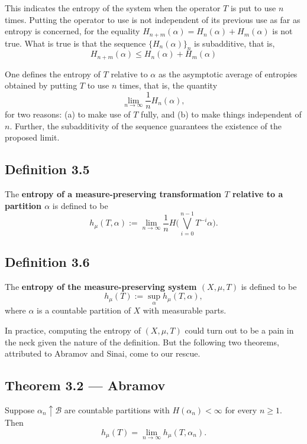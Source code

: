 \documentclass[11pt,a4paper]{article}
\begin{document}
This indicates the entropy of the system when the operator $T$ is put to use
$n$ times. Putting the operator to use is not independent of its previous use
as far as entropy is concerned, for the equality
$H_{n+m}(\alpha)=H_n(\alpha)+H_m(\alpha)$ is not true. What is true is that
the sequence $\{H_n(\alpha)\}_n$ is subadditive, that is,
\[
H_{n+m}(\alpha)\leq H_{n}(\alpha) + H_{m}(\alpha)
\]

One defines the entropy of $T$ relative to $\alpha$ as the asymptotic average
of entropies obtained by putting $T$ to use $n$ times, that is, the quantity
\[
\lim_{n\rightarrow\infty}\frac1n H_n(\alpha),
\]
for two reasons: (a) to make use of $T$ fully, and (b) to make things
independent of $n$. Further, the subadditivity of the sequence guarantees the
existence of the proposed limit.

\subsection*{Definition 3.5}
The \textbf{entropy of a measure-preserving transformation $T$ relative to a partition $\alpha$} is defined to be
\[
h_{\mu}(T, \alpha):= \lim_{n\rightarrow\infty}\frac{1}{n}H\Bigg(\bigvee_{i=0}^{n-1}T^{-i}\alpha\Bigg).
\]

\subsection*{Definition 3.6}
The \textbf{entropy of the measure-preserving system $(X, \mu, T)$} is defined to be
\[
h_{\mu}(T) := \sup_{\alpha}h_{\mu}(T, \alpha),
\]
where $\alpha$ is a countable partition of $X$ with measurable parts.

In practice, computing the entropy of $(X,\mu,T)$ could turn out to be a pain
in the neck given the nature of the definition. But the following two
theorems, attributed to Abramov and Sinai, come to our rescue.

\subsection*{Theorem 3.2 --- Abramov}
Suppose $\alpha_n\uparrow\mathcal B$ are countable partitions with $H(\alpha_n)<\infty$ for every $n\geq1$. Then
\[
h_\mu(T)=\lim_{n\to\infty}h_\mu(T,\alpha_n).
\]
\end{document}
